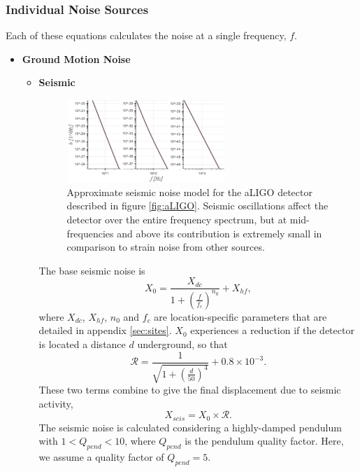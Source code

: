 \documentclass{article}
\begin{document}
\subsubsection{Individual Noise Sources}
Each of these equations calculates the noise at a single frequency, $f$.
\begin{itemize}
	\item \textbf{Ground Motion Noise} \par
    \begin{itemize}
    \item \textbf{Seismic} \par
       \begin{figure}[h!]
    \centering
    \includegraphics[width=0.6\textwidth]{SPQ_aLIGO_seismic.pdf}
    \caption{Approximate seismic noise model for the aLIGO detector described in figure \ref{fig:aLIGO}. Seismic oscillations affect the detector over the entire frequency spectrum, but at mid-frequencies and above its contribution is extremely small in comparison to strain noise from other sources.}
    \label{fig:seismic}
    \end{figure}
   The base seismic noise is
    \begin{equation}
    \label{eqn::baseseismic}
    X_0 = \frac{X_{dc}}{1 + \left(\frac{f}{f_c}\right)^{n_0}} + X_{hf},
    \end{equation}
    where $X_{dc}$, $X_{hf}$, $n_0$ and $f_c$ are location-specific parameters that are detailed in appendix \ref{sec:sites}. $X_0$ experiences a reduction if the detector is located a distance $d$ underground, so that
    \[
    \mathcal{R} = \frac{1}{\sqrt{1 + \left(\frac{d}{50}\right)^4}} + 0.8\times10^{-3} .
    \]
    These two terms combine to give the final displacement due to seismic activity,
    \begin{equation}
        X_{seis} = X_0 \times \mathcal{R}.
    \label{eq:Xseis}
    \end{equation}
    The seismic noise is calculated considering a highly-damped pendulum with $1 < Q_{pend} < 10$, where $Q_{pend}$ is the pendulum quality factor. Here, we assume a quality factor of $Q_{pend} = 5$. 
    

\end{itemize}
\end{itemize}
\end{document}
